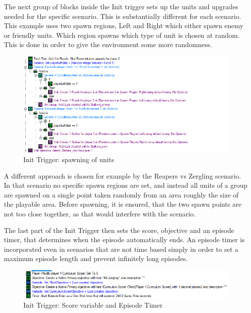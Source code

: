 The next group of blocks inside the Init trigger sets up the units and upgrades needed for the specific scenario. This is substantially different for each scenario. This example uses two spawn regions, Left and Right which either spawn enemy or friendly units. Which region spawns which type of unit is chosen at random. This is done in order to give the environment some more randomness.

\begin{figure}[htb]
  \centering
      \includegraphics[width=1\textwidth]{Figures/Triggers/trigger_init_units.png}
  \caption{ Init Trigger: spawning of units }
\end{figure}

A different approach is chosen for example by the Reapers vs Zergling scenario. In that scenario no specific spawn regions are set, and instead all units of a group are spawned on a single point taken randomly from an area roughly the size of the playable area. Before spawning, it is ensured, that the two spawn points are not too close together, as that would interfere with the scenario.

The last part of the Init Trigger then sets the score, objective and an episode timer, that determines when the episode automatically ends. An episode timer is incorporated even in scenarios that are not time based simply in order to set a maximum episode length and prevent infinitely long episodes.

\begin{figure}[htb]
  \centering
      \includegraphics[width=1\textwidth]{Figures/Triggers/trigger_init_timer.png}
  \caption{ Init Trigger: Score variable and Episode Timer }
\end{figure}

